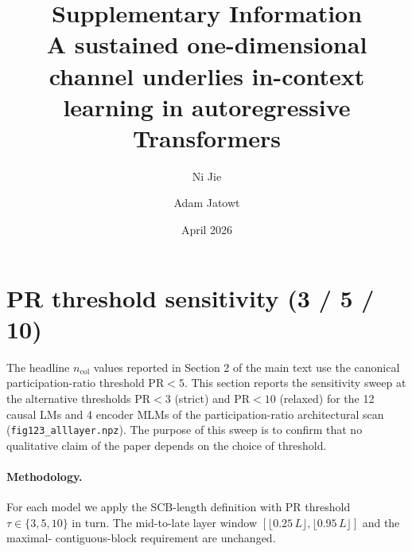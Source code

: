 \documentclass[11pt,a4paper]{article}
\title{Supplementary Information \\
       \large A sustained one-dimensional channel underlies in-context
       learning in autoregressive Transformers}
\author{Ni Jie \and Adam Jatowt}
\date{April 2026}
\begin{document}
\maketitle
\tableofcontents
\bigskip

\section{PR threshold sensitivity (3 / 5 / 10)}
\label{si:S1}

The headline $n_\mathrm{col}$ values reported in Section 2 of the main
text use the canonical participation-ratio threshold $\mathrm{PR} < 5$.
This section reports the sensitivity sweep at the alternative
thresholds $\mathrm{PR} < 3$ (strict) and $\mathrm{PR} < 10$ (relaxed)
for the 12 causal LMs and 4 encoder MLMs of the participation-ratio
architectural scan (\texttt{fig123\_alllayer.npz}).  The purpose of
this sweep is to confirm that no qualitative claim of the paper
depends on the choice of threshold.

\paragraph{Methodology.}
For each model we apply the SCB-length definition with PR threshold
$\tau \in \{3, 5, 10\}$ in turn.  The mid-to-late layer window
$[\lfloor 0.25\,L \rfloor, \lfloor 0.95\,L \rfloor]$ and the maximal-
contiguous-block requirement are unchanged.
\end{document}

